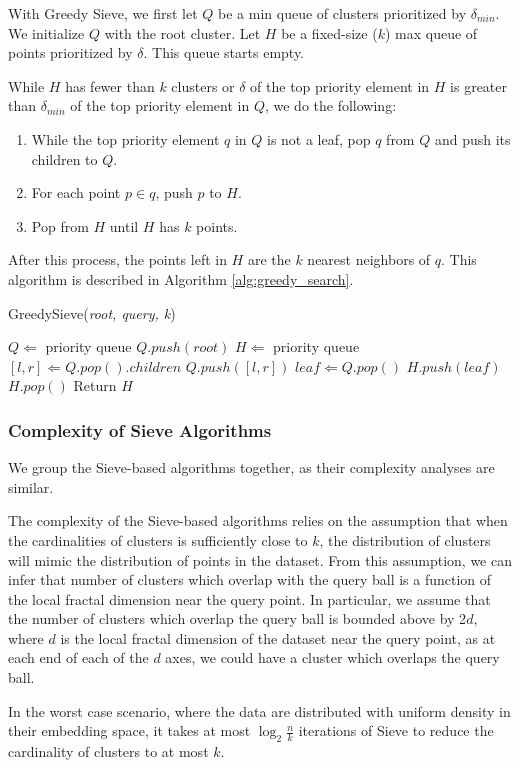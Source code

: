 With Greedy Sieve, we first let $Q$ be a min queue of clusters prioritized by $\delta_{min}$. We initialize $Q$ with the root cluster.
Let $H$ be a fixed-size ($k$) max queue of points prioritized by $\delta$. This queue starts empty.

While $H$ has fewer than $k$ clusters or $\delta$ of the top priority element in $H$ is greater 
than $\delta_{min}$ of the top priority element in $Q$, we do the following:
\begin{enumerate}
\item While the top priority element $q$ in $Q$ is not a leaf, pop $q$ from $Q$ and push its children to $Q$.
\item For each point $p \in q$, push $p$ to $H$. 
\item Pop from $H$ until $H$ has $k$ points. 
\end{enumerate}
After this process, the points left in $H$ are the $k$ nearest neighbors of $q$. This algorithm is described in Algorithm \ref{alg:greedy_search}.

\begin{algorithm} 
\caption{GreedySieve(\emph{root, query, k})} 
\label{alg:greedy_search} 
\begin{algorithmic}
    \STATE $Q \Leftarrow$ priority queue
    \STATE $Q.push(root)$
    \STATE $H \Leftarrow$ priority queue
            \STATE $[l, r] \Leftarrow Q.pop().children$
            \STATE $Q.push([l, r])$
        \ENDWHILE
        \STATE $leaf \Leftarrow Q.pop()$
        \STATE $H.push(leaf)$
            \STATE $H.pop()$
        \ENDWHILE
    \ENDWHILE
    \STATE Return $H$
\end{algorithmic}
\end{algorithm}

\subsubsection{Complexity of Sieve Algorithms}
\label{paragraph:methods:sieve-complexity}

We group the Sieve-based algorithms together, as their complexity analyses are similar.

The complexity of the Sieve-based algorithms relies on the assumption that when the cardinalities of clusters is sufficiently close to $k$, the distribution of clusters will mimic the distribution of points in the dataset. 
From this assumption, we can infer that number of clusters which overlap with the query ball is a function of the local fractal dimension near the query point.
In particular, we assume that the number of clusters which overlap the query ball is bounded above by 2$d$, where $d$ is the local fractal dimension of the dataset near the query point, as at each end of each of the $d$ axes, we could have a cluster which overlaps the query ball.

In the worst case scenario, where the data are distributed with uniform density in their embedding space, it takes at most $\log_2{\frac{n}{k}}$ iterations of Sieve to reduce the cardinality of clusters to at most $k$. 



